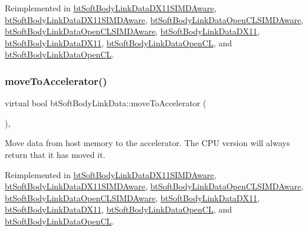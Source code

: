 Reimplemented in \hyperlink{classbtSoftBodyLinkDataDX11SIMDAware_ab498ee8250262804abb96ee7f67cba29}{bt\+Soft\+Body\+Link\+Data\+D\+X11\+S\+I\+M\+D\+Aware}, \hyperlink{classbtSoftBodyLinkDataDX11SIMDAware_a693af44067395dc322c7cd575f79b980}{bt\+Soft\+Body\+Link\+Data\+D\+X11\+S\+I\+M\+D\+Aware}, \hyperlink{classbtSoftBodyLinkDataOpenCLSIMDAware_a37ded0994aded2026babb6c35838af75}{bt\+Soft\+Body\+Link\+Data\+Open\+C\+L\+S\+I\+M\+D\+Aware}, \hyperlink{classbtSoftBodyLinkDataOpenCLSIMDAware_ac76fd4a1a8b28a48e283050efc14a096}{bt\+Soft\+Body\+Link\+Data\+Open\+C\+L\+S\+I\+M\+D\+Aware}, \hyperlink{classbtSoftBodyLinkDataDX11_a6b08733c3c0216869e893779fb55d4c0}{bt\+Soft\+Body\+Link\+Data\+D\+X11}, \hyperlink{classbtSoftBodyLinkDataDX11_a3f94047cb03b1604946c20ae944946a0}{bt\+Soft\+Body\+Link\+Data\+D\+X11}, \hyperlink{classbtSoftBodyLinkDataOpenCL_a6957608260f4a848712de1ad0b8f863f}{bt\+Soft\+Body\+Link\+Data\+Open\+CL}, and \hyperlink{classbtSoftBodyLinkDataOpenCL_a5e820163521c0848b6b4f025add87213}{bt\+Soft\+Body\+Link\+Data\+Open\+CL}.

\mbox{\label{classbtSoftBodyLinkData_a6cce268f804d465f3bc998771d3a7433}} 
\subsubsection{\texorpdfstring{move\+To\+Accelerator()}{moveToAccelerator()}\hspace{0.1cm}{\footnotesize\ttfamily [2/2]}}
{\footnotesize\ttfamily virtual bool bt\+Soft\+Body\+Link\+Data\+::move\+To\+Accelerator (\begin{DoxyParamCaption}{ }\end{DoxyParamCaption})\hspace{0.3cm}{\ttfamily [inline]}, {\ttfamily [virtual]}}

Move data from host memory to the accelerator. The C\+PU version will always return that it has moved it. 

Reimplemented in \hyperlink{classbtSoftBodyLinkDataDX11SIMDAware_ab498ee8250262804abb96ee7f67cba29}{bt\+Soft\+Body\+Link\+Data\+D\+X11\+S\+I\+M\+D\+Aware}, \hyperlink{classbtSoftBodyLinkDataDX11SIMDAware_a693af44067395dc322c7cd575f79b980}{bt\+Soft\+Body\+Link\+Data\+D\+X11\+S\+I\+M\+D\+Aware}, \hyperlink{classbtSoftBodyLinkDataOpenCLSIMDAware_a37ded0994aded2026babb6c35838af75}{bt\+Soft\+Body\+Link\+Data\+Open\+C\+L\+S\+I\+M\+D\+Aware}, \hyperlink{classbtSoftBodyLinkDataOpenCLSIMDAware_ac76fd4a1a8b28a48e283050efc14a096}{bt\+Soft\+Body\+Link\+Data\+Open\+C\+L\+S\+I\+M\+D\+Aware}, \hyperlink{classbtSoftBodyLinkDataDX11_a6b08733c3c0216869e893779fb55d4c0}{bt\+Soft\+Body\+Link\+Data\+D\+X11}, \hyperlink{classbtSoftBodyLinkDataDX11_a3f94047cb03b1604946c20ae944946a0}{bt\+Soft\+Body\+Link\+Data\+D\+X11}, \hyperlink{classbtSoftBodyLinkDataOpenCL_a6957608260f4a848712de1ad0b8f863f}{bt\+Soft\+Body\+Link\+Data\+Open\+CL}, and \hyperlink{classbtSoftBodyLinkDataOpenCL_a5e820163521c0848b6b4f025add87213}{bt\+Soft\+Body\+Link\+Data\+Open\+CL}.

